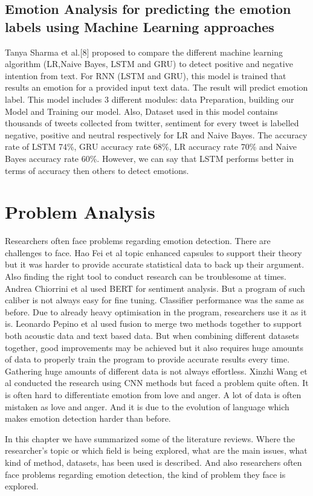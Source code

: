 \subsection{Emotion Analysis for predicting the emotion labels using Machine Learning approaches}
Tanya Sharma et al.[8] proposed to compare the different machine learning algorithm (LR,Naive Bayes, LSTM and GRU) to detect positive and negative intention from text. For RNN (LSTM and GRU), this model is trained that results an emotion for a provided input text data. The result will predict emotion label. This model includes 3 different modules: data Preparation, building our Model and Training our model. Also, Dataset used in this model contains thousands of tweets collected from twitter, sentiment for every tweet is labelled negative, positive and neutral respectively for LR and Naive Bayes. The accuracy rate of LSTM 74\%, GRU accuracy rate 68\%, LR accuracy rate 70\% and Naive Bayes accuracy rate 60\%. However, we can say that LSTM performs better in terms of accuracy then others to detect emotions.

\section{Problem Analysis}
Researchers often face problems regarding emotion detection. There are challenges to face. Hao Fei et al topic enhanced capsules to support their theory but it was harder to provide accurate statistical data to back up their argument. Also finding the right tool to conduct research can be troublesome at times. Andrea Chiorrini et al used BERT for sentiment analysis. But a program of such caliber is not always easy for fine tuning. Classifier performance was the same as before. Due to already heavy optimisation in the program, researchers use it as it is. Leonardo Pepino et al used fusion to merge two methods together to support both acoustic data and text based data. But when combining different datasets together, good improvements may be achieved but it also requires huge amounts of data to properly train the program to provide accurate results every time. Gathering huge amounts of different data is not always effortless. Xinzhi Wang et al conducted the research using CNN methods but faced a problem quite often. It is often hard to differentiate emotion from love and anger. A lot of data is often mistaken as love and anger. And it is due to the evolution of language which makes emotion detection harder than before.


In this chapter we have summarized some of the literature reviews. Where the researcher's topic or which field is being explored, what are the main issues, what kind of method, datasets, has been used is described. And also researchers often face problems regarding emotion detection, the kind of problem they face is explored.







